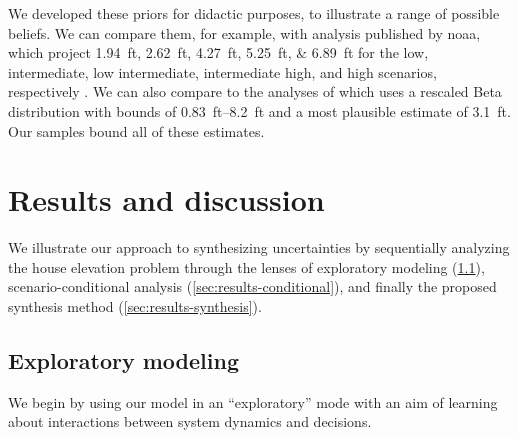 \documentclass{agujournal2019}
\begin{document}
We developed these priors for didactic purposes, to illustrate a range of possible beliefs.
We can compare them, for example, with analysis published by \gls{noaa}, which project \SIlist{1.94;2.62;4.27;5.25;6.89}{ft} for the low, intermediate, low intermediate, intermediate high, and high scenarios, respectively \cite[table.~2.4]{sweet_slr:2022}.
We can also compare to the analyses of  which uses a rescaled Beta distribution with bounds of \SIrange{0.83}{8.2}{ft} and a most plausible estimate of \SI{3.1}{ft}.
Our samples bound all of these estimates.

\section{Results and discussion}\label{sec:results}

We illustrate our approach to synthesizing uncertainties by sequentially analyzing the house elevation problem through the lenses of exploratory modeling (\cref{sec:results-exploratory}), scenario-conditional analysis (\cref{sec:results-conditional}), and finally the proposed synthesis method (\cref{sec:results-synthesis}).

\subsection{Exploratory modeling}\label{sec:results-exploratory}

We begin by using our model in an ``exploratory'' mode with an aim of learning about interactions between system dynamics and decisions.
\end{document}
